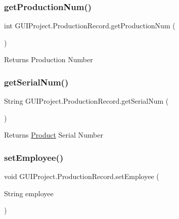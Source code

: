 \subsubsection{\texorpdfstring{getProductionNum()}{getProductionNum()}}
{\footnotesize\ttfamily int G\+U\+I\+Project.\+Production\+Record.\+get\+Production\+Num (\begin{DoxyParamCaption}{ }\end{DoxyParamCaption})}

\begin{DoxyReturn}{Returns}
Production Number 
\end{DoxyReturn}
\mbox{\label{class_g_u_i_project_1_1_production_record_a233c37c4649b043691b0d00be54b42a6}} 
\subsubsection{\texorpdfstring{getSerialNum()}{getSerialNum()}}
{\footnotesize\ttfamily String G\+U\+I\+Project.\+Production\+Record.\+get\+Serial\+Num (\begin{DoxyParamCaption}{ }\end{DoxyParamCaption})}

\begin{DoxyReturn}{Returns}
\mbox{\hyperlink{class_g_u_i_project_1_1_product}{Product}} Serial Number 
\end{DoxyReturn}
\mbox{\label{class_g_u_i_project_1_1_production_record_abdb239f823249bb8b490d5b8b71f3ab2}} 
\subsubsection{\texorpdfstring{setEmployee()}{setEmployee()}}
{\footnotesize\ttfamily void G\+U\+I\+Project.\+Production\+Record.\+set\+Employee (\begin{DoxyParamCaption}\item[{String}]{employee }\end{DoxyParamCaption})}


